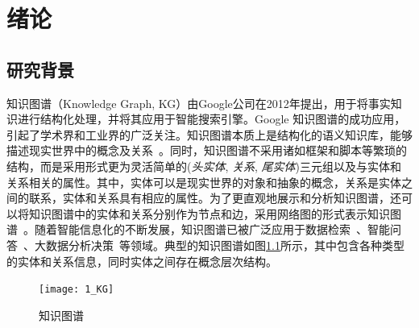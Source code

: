 \documentclass[algorithmlist, AutoFakeBold, AutoFakeSlant, figurelist, tablelist, nomlist, engineering, openany]{seuthesix} %
\begin{document}
\chapter{绪论}
\section{研究背景}
知识图谱（Knowledge Graph, KG）由Google公司在2012年提出，用于将事实知识进行结构化处理，并将其应用于智能搜索引擎。Google 知识图谱的成功应用，引起了学术界和工业界的广泛关注。知识图谱本质上是结构化的语义知识库，能够描述现实世界中的概念及关系~\cite{nickel2015review}。同时，知识图谱不采用诸如框架和脚本等繁琐的结构，而是采用形式更为灵活简单的(\textit{头实体}, \textit{关系}, \textit{尾实体})三元组以及与实体和关系相关的属性。其中，实体可以是现实世界的对象和抽象的概念，关系是实体之间的联系，实体和关系具有相应的属性。为了更直观地展示和分析知识图谱，还可以将知识图谱中的实体和关系分别作为节点和边，采用网络图的形式表示知识图谱~\cite{noy2019industry}。随着智能信息化的不断发展，知识图谱已被广泛应用于数据检索~\cite{rinaldi2021semantic,sarhan2021open,li2021research}、智能问答~\cite{li2021improving,do2021developing}、大数据分析决策~\cite{zhou2021geoscience,abu2021relational}等领域。典型的知识图谱如图\ref{1_KG}所示，其中包含各种类型的实体和关系信息，同时实体之间存在概念层次结构。
\begin{figure}[h]
  \centering
  \texttt{[image: 1\_KG]}
  \caption{知识图谱}
  \label{1_KG}
\end{figure}
\end{document}
